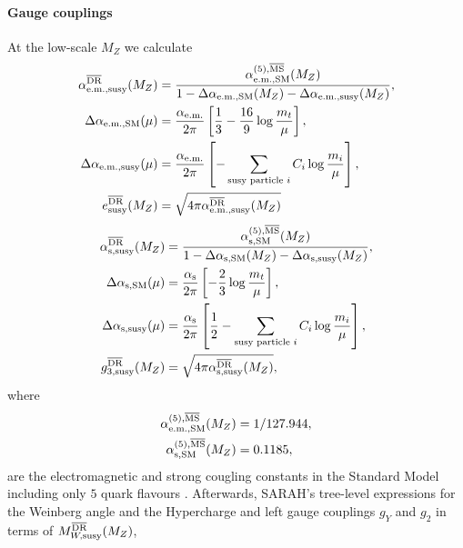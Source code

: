 \paragraph{Gauge couplings}

At the low-scale $M_Z$ we calculate
%
\begin{align}
  \alpha_{\text{e.m.},\text{susy}}^{\text{$\overline{\mbox{DR}}$}}(M_Z) &=
  \frac{\alpha_{\text{e.m.},\text{SM}}^{(5),\text{$\overline{\mbox{MS}}$}}(M_Z)}{1 -
    \Delta\alpha_{\text{e.m.},\text{SM}}(M_Z) -
    \Delta\alpha_{\text{e.m.},\text{susy}}(M_Z)} ,\\
  \Delta\alpha_{\text{e.m.},\text{SM}}(\mu) &=
  \frac{\alpha_\text{e.m.}}{2\pi} \left[\frac{1}{3}
    - \frac{16}{9} \log{\frac{m_t}{\mu}} \right],\\
  \Delta\alpha_{\text{e.m.},\text{susy}}(\mu) &=
  \frac{\alpha_\text{e.m.}}{2\pi} \left[ -\sum_{\text{susy particle }
      i}
    C_i \log{\frac{m_i}{\mu}} \right],\\
    e_{\text{susy}}^{\text{$\overline{\mbox{DR}}$}}(M_Z) &=
    \sqrt{4\pi\alpha_{\text{e.m.},\text{susy}}^{\text{$\overline{\mbox{DR}}$}}(M_Z)}
\end{align}
%
\begin{align}
  \alpha_{\text{s},\text{susy}}^{\text{$\overline{\mbox{DR}}$}}(M_Z) &=
  \frac{\alpha_{\text{s},\text{SM}}^{(5),\text{$\overline{\mbox{MS}}$}}(M_Z)}{1 -
    \Delta\alpha_{\text{s},\text{SM}}(M_Z)
    - \Delta\alpha_{\text{s},\text{susy}}(M_Z)} ,\\
  \Delta\alpha_{\text{s},\text{SM}}(\mu) &=
  \frac{\alpha_\text{s}}{2\pi} \left[
    -\frac{2}{3} \log{\frac{m_t}{\mu}} \right],\\
  \Delta\alpha_{\text{s},\text{susy}}(\mu) &=
  \frac{\alpha_\text{s}}{2\pi}\left[ \frac{1}{2}-\sum_{\text{susy
        particle } i} C_i \log{\frac{m_i}{\mu}} \right] ,\\
  g_{3,\text{susy}}^{\text{$\overline{\mbox{DR}}$}}(M_Z) &=
  \sqrt{4\pi\alpha_{\text{s},\text{susy}}^{\text{$\overline{\mbox{DR}}$}}(M_Z)} ,
\end{align}
%
where
%
\begin{align}
  \alpha_{\text{e.m.},\text{SM}}^{(5),\text{$\overline{\mbox{MS}}$}}(M_Z) &= 1/127.944,\\
  \alpha_{\text{s},\text{SM}}^{(5),\text{$\overline{\mbox{MS}}$}}(M_Z) &= 0.1185,
\end{align}
%
are the \MSbar electromagnetic and strong cougling constants in the
Standard Model including only $5$ quark flavours
\cite{Beringer:1900zz}.  Afterwards, SARAH's tree-level expressions
for the Weinberg angle and the Hypercharge and left gauge couplings
$g_Y$ and $g_2$ in terms of $M_{W,\text{susy}}^{\text{$\overline{\mbox{DR}}$}}(M_Z)$,
